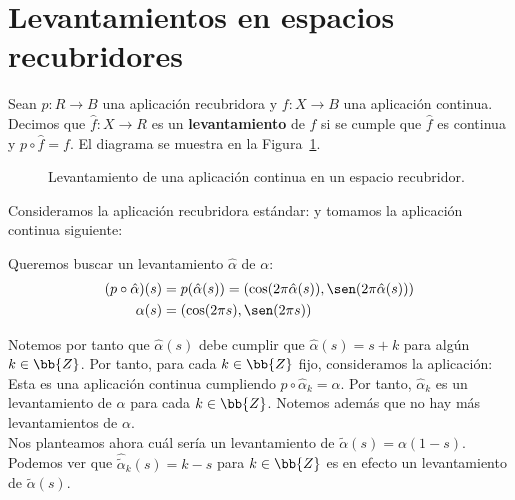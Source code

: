 \section{Levantamientos en espacios recubridores}\label{sec:levantamientos_espacios_recubridores}

\begin{definicion}
    Sean $p:R\to B$ una aplicación recubridora y $f:X\to B$ una aplicación continua. Decimos que $\hat{f}:X\to R$ es un \textbf{levantamiento} de $f$ si se cumple que $\hat{f}$ es continua y $p\circ \hat{f} = f$. El diagrama se muestra en la Figura~\ref{fig:levantamiento}.
    \begin{figure}[ht]
        \centering
        \caption{Levantamiento de una aplicación continua en un espacio recubridor.}
        \label{fig:levantamiento}
    \end{figure}%
\end{definicion}

\begin{ejemplo}
    Consideramos la aplicación recubridora estándar:
    y tomamos la aplicación continua siguiente:

    Queremos buscar un levantamiento $\hat{\alpha}$ de $\alpha$:
    \begin{align*}
        (p\circ \hat{\alpha})(s) &= p(\hat{\alpha}(s)) = (\cos(2\pi \hat{\alpha}(s)), \sen(2\pi \hat{\alpha}(s)))\\
        \alpha(s) &= (\cos(2\pi s), \sen(2\pi s))
    \end{align*}

    Notemos por tanto que $\hat{\alpha}(s)$ debe cumplir que $\hat{\alpha}(s) = s + k$ para algún $k\in \bb{Z}$. Por tanto, para cada $k\in \bb{Z}$ fijo, consideramos la aplicación: 
    Esta es una aplicación continua cumpliendo $p\circ \hat{\alpha}_k = \alpha$. Por tanto, $\hat{\alpha}_k$ es un levantamiento de $\alpha$ para cada $k\in \bb{Z}$. Notemos además que no hay más levantamientos de $\alpha$.\\
    
    Nos planteamos ahora cuál sería un levantamiento de $\tilde{\alpha}(s) = \alpha(1-s)$. Podemos ver que $\widehat{\tilde{\alpha}}_k(s) = k-s$ para $k\in \bb{Z}$ es en efecto un levantamiento de $\tilde{\alpha}(s)$.
\end{ejemplo}~\\

